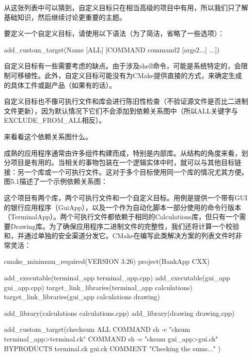 从这张列表中可以猜到，自定义目标只在相当高级的项目中有用，所以我们只了解基础知识，然后继续讨论更重要的主题。

要定义一个自定义目标，请使用以下语法（为了简洁，省略了一些选项）：

\begin{shell}
add_custom_target(Name [ALL] [COMMAND command2 [args2...] ...])
\end{shell}

自定义目标有一些需要考虑的缺点。由于涉及shell命令，可能是系统特定的，会限制可移植性。此外，自定义目标可能没有为CMake提供直接的方式，来确定生成的具体工件或副产品（如果有的话）。

自定义目标也不像可执行文件和库会进行陈旧性检查（不验证源文件是否比二进制文件更新），因为默认情况下它们不会添加到依赖关系图中（所以ALL关键字与EXCLUDE\_FROM\_ALL相反）。

来看看这个依赖关系图什么。


成熟的应用程序通常由许多组件构建而成，特别是内部库。从结构的角度来看，划分项目是有用的。当相关的事物包装在一个逻辑实体中时，就可以与其他目标链接：另一个库或一个可执行文件。这对于多个目标使用同一个库的情况尤其方便。图5.1描述了一个示例依赖关系图：


这个项目有两个库，两个可执行文件和一个自定义目标。用例是提供一个带有GUI的银行应用程序（GuiApp），以及一个作为自动化脚本一部分使用的命令行版本（TerminalApp）。两个可执行文件都依赖于相同的Calculations库，但只有一个需要Drawing库。为了确保应用程序二进制文件的完整性，我们还将计算一个校验和，并通过单独的安全渠道分发它。CMake在编写此类解决方案的列表文件时非常灵活：


\begin{cmake}
cmake_minimum_required(VERSION 3.26)
project(BankApp CXX)

add_executable(terminal_app terminal_app.cpp)
add_executable(gui_app gui_app.cpp)
target_link_libraries(terminal_app calculations)
target_link_libraries(gui_app calculations drawing)

add_library(calculations calculations.cpp)
add_library(drawing drawing.cpp)

add_custom_target(checksum ALL
    COMMAND sh -c "cksum terminal_app>terminal.ck"
    COMMAND sh -c "cksum gui_app>gui.ck"
    BYPRODUCTS terminal.ck gui.ck
    COMMENT "Checking the sums..."
)
\end{cmake}


